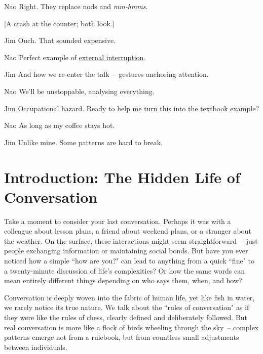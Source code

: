 \begin{sloppypar}
\begin{dialogue}
\item[Nao] Right. They replace nods and \textit{mm-hmms}. 

[A crash at the counter; both look.]

\item[Jim] Ouch. That sounded expensive.

\item[Nao] Perfect example of \uline{external interruption}.

\item[Jim] And how we re-enter the talk~-- gestures anchoring attention.

\item[Nao] We'll be unstoppable, analysing everything.

\item[Jim] Occupational hazard. Ready to help me turn this into the textbook example?

\item[Nao] As long as my coffee stays hot.

\item[Jim] Unlike mine. Some patterns are hard to break.
\end{dialogue}

\end{sloppypar}

\section{Introduction: The Hidden Life of Conversation} \label{sec:intro}

Take a moment to consider your last conversation. Perhaps it was with a colleague about lesson plans, a friend about weekend plans, or a stranger about the weather. On the surface, these interactions might seem straightforward~-- just people exchanging information or maintaining social bonds. But have you ever noticed how a simple ``how are you?" can lead to anything from a quick ``fine" to a twenty-minute discussion of life's complexities? Or how the same words can mean entirely different things depending on who says them, when, and how?

Conversation is deeply woven into the fabric of human life, yet like fish in water, we rarely notice its true nature. We talk about the ``rules of conversation" as if they were like the rules of chess, clearly defined and deliberately followed. But real conversation is more like a flock of birds wheeling through the sky~-- complex patterns emerge not from a rulebook, but from countless small adjustments between individuals.

